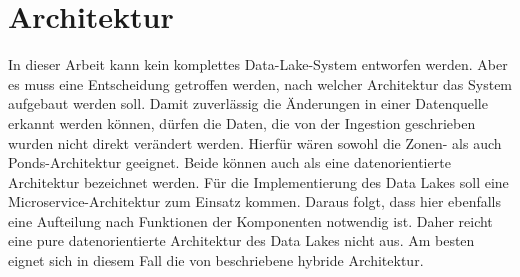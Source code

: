 \section{Architektur}
In dieser Arbeit kann kein komplettes Data-Lake-System entworfen werden.
Aber es muss eine Entscheidung getroffen werden, nach welcher Architektur das System aufgebaut werden soll.
Damit zuverlässig die Änderungen in einer Datenquelle erkannt werden können, dürfen die Daten, die von der Ingestion geschrieben wurden nicht direkt verändert werden.
Hierfür wären sowohl die Zonen- als auch Ponds-Architektur geeignet.
Beide können auch als eine datenorientierte Architektur bezeichnet werden.
Für die Implementierung des Data Lakes soll eine Microservice-Architektur zum Einsatz kommen.
Daraus folgt, dass hier ebenfalls eine Aufteilung nach Funktionen der Komponenten notwendig ist.
Daher reicht eine pure datenorientierte Architektur des Data Lakes nicht aus.
Am besten eignet sich in diesem Fall die von \textcite{sawadogo2021data} beschriebene hybride Architektur.

